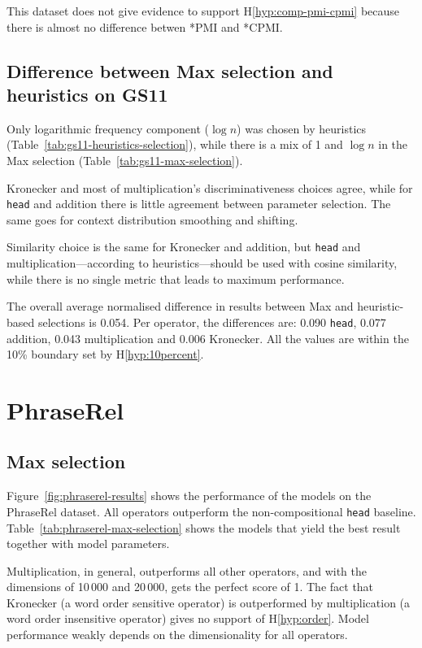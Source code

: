 This dataset does not give evidence to support H\ref{hyp:comp-pmi-cpmi} because there is almost no difference betwen *PMI and *CPMI.

\subsection{Difference between Max selection and heuristics on GS11}

Only logarithmic frequency component ($\log n$) was chosen by heuristics (Table~\ref{tab:gs11-heuristics-selection}), while there is a mix of 1 and $\log n$ in the Max selection (Table~\ref{tab:gs11-max-selection}).

Kronecker and most of multiplication's discriminativeness choices agree, while for \texttt{head} and addition there is little agreement between parameter selection. The same goes for context distribution smoothing and shifting.

Similarity choice is the same for Kronecker and addition, but \texttt{head} and multiplication---according to heuristics---should be used with cosine similarity, while there is no single metric that leads to maximum performance.

The overall average normalised difference in results between Max and heuristic-based selections is 0.054. Per operator, the differences are: 0.090 \texttt{head}, 0.077 addition, 0.043 multiplication and 0.006 Kronecker. All the values are within the 10\% boundary set by H\ref{hyp:10percent}.

\section{PhraseRel}
\label{sec:phraserel-experiment}

\subsection{Max selection}
\label{sec:max-selection-phraserel}



Figure~\ref{fig:phraserel-results} shows the performance of the models on the PhraseRel dataset. All operators outperform the non-compositional \texttt{head} baseline. Table~\ref{tab:phraserel-max-selection} shows the models that yield the best result together with model parameters.

Multiplication, in general, outperforms all other operators, and with the dimensions of 10\,000 and 20\,000, gets the perfect score of 1. The fact that Kronecker (a word order sensitive operator) is outperformed by multiplication (a word order insensitive operator) gives no support of H\ref{hyp:order}. Model performance weakly depends on the dimensionality for all operators.

